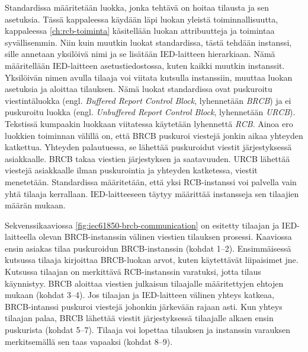 Standardissa määritetään luokka, jonka tehtävä on hoitaa tilausta ja sen asetuksia. Tässä kappaleessa käydään läpi luokan yleistä toiminnallisuutta, kappaleessa \ref{ch:rcb-toiminta} käsitellään luokan attribuutteja ja toimintaa syvällisemmin. Niin kuin muutkin luokat standardissa, tästä tehdään instanssi, sille annetaan yksilöivä nimi ja se lisätään IED-laitteen hierarkiaan. Nämä määritellään IED-laitteen asetustiedostossa, kuten kaikki muutkin instanssit. Yksilöivän nimen avulla tilaaja voi viitata kutsulla instanssiin, muuttaa luokan asetuksia ja aloittaa tilauksen. Nämä luokat standardissa ovat puskuroitu viestintäluokka (engl. \emph{Buffered Report Control Block}, lyhennetään \emph{BRCB}) ja ei puskuroitu luokka (engl. \emph{Unbuffered Report Control Block}, lyhennetään \emph{URCB}). Tekstissä kumpaakin luokkaan viitatessa käytetään lyhennettä \emph{RCB}. Ainoa ero luokkien toiminnan välillä on, että BRCB puskuroi viestejä jonkin aikaa yhteyden katkettua. Yhteyden palautuessa, se lähettää puskuroidut viestit järjestyksessä asiakkaalle. BRCB takaa viestien järjestyksen ja saatavuuden. URCB lähettää viestejä asiakkaalle ilman puskurointia ja yhteyden katketessa, viestit menetetään. Standardissa määritetään, että yksi RCB-instanssi voi palvella vain yhtä tilaaja kerrallaan. IED-laitteeseen täytyy määrittää instansseja sen tilaajien määrän mukaan.

Sekvenssikaaviossa \ref{fig:iec61850-brcb-communication} on esitetty tilaajan ja IED-laitteella olevan BRCB-instanssin välinen viestien tilauksen prosessi. Kaaviossa ensin asiakas tilaa puskuroidun BRCB-ins\-tans\-sin (kohdat 1--2). Ensimmäisessä kutsussa tilaaja kirjoittaa BRCB-luokan arvot, kuten käytettävät liipaisimet jne. Kutsussa tilaajan on merkittävä RCB-ins\-tans\-sin varatuksi, jotta tilaus käynnistyy. BRCB aloittaa viestien julkaisun tilaajalle määritettyjen ehtojen mukaan (kohdat 3--4). Jos tilaajan ja IED-laitteen välinen yhteys katkeaa, BRCB-intanssi puskuroi viestejä johonkin järkevään rajaan asti. Kun yhteys tilaajan palaa, BRCB lähettää viestit järjestyksessä tilaajalle alkaen ensin puskurista (kohdat 5--7). Tilaaja voi lopettaa tilauksen ja instanssin varauksen merkitsemällä sen taas vapaaksi (kohdat 8--9).

